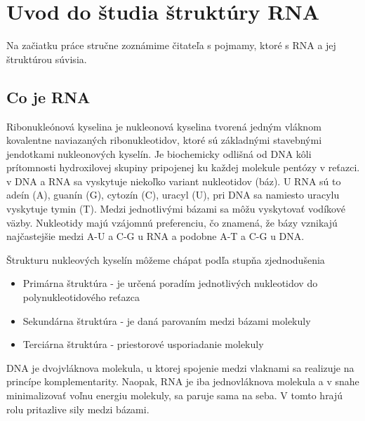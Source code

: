 \renewcommand{\SS}{\mathbb{S}}
\newcommand{\Par}[2]{\mbox{$( #1, #2 )$}}
\usetikzlibrary{positioning, shapes, trees, graphs} %
\newcommand{\scale}{0.6}

\chapter{Uvod do študia štruktúry RNA}
Na začiatku práce stručne zoznámime čitateľa s pojmamy, ktoré s RNA a jej štruktúrou súvisia.


\section{Co je RNA}

 
 Ribonukleónová kyselina je nukleonová kyselina tvorená jedným vláknom kovalentne naviazaných ribonukleotidov, 
 ktoré sú základnými stavebnými jendotkami nukleonových kyselín. Je biochemicky odlišná od DNA kôli prítomnosti 
 hydroxilovej skupiny pripojenej ku každej molekule pentózy v reťazci.
 v DNA a RNA sa vyskytuje niekoľko variant nukleotidov (báz). U RNA sú to
adeín (A), guanín (G), cytozín (C), uracyl (U),
pri DNA sa namiesto uracylu vyskytuje tymin (T).
Medzi jednotlivými bázami sa môžu vyskytovať vodíkové väzby. Nukleotidy majú
vzájomnú preferenciu, čo znamená, že bázy vznikajú najčastejšie medzi A-U a C-G
u RNA a podobne A-T a C-G u DNA.

Štrukturu nukleových kyselín môžeme chápat podľa stupňa zjednodušenia
\begin{itemize}
  \item Primárna štruktúra - je určená poradím jednotlivých nukleotidov
    do polynukleotidového reťazca
  \item Sekundárna štruktúra - je daná parovaním medzi bázami molekuly
  \item Terciárna štruktúra - priestorové usporiadanie molekuly
\end{itemize}
DNA je dvojvláknova molekula, u ktorej spojenie medzi vlaknami sa realizuje na princípe
komplementarity.
Naopak, RNA je iba jednovláknova molekula a v snahe minimalizovať voľnu energiu molekuly,
sa paruje sama na seba. V tomto hrajú rolu pritazlive sily medzi bázami.

